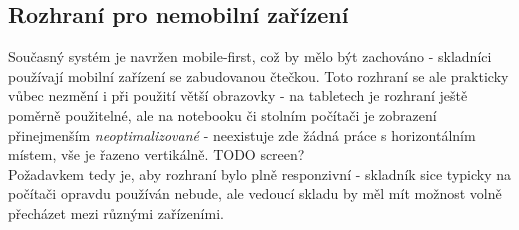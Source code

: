 \subsection{Rozhraní pro nemobilní zařízení}

Současný systém je navržen mobile-first, což by mělo být zachováno - skladníci používají mobilní zařízení se zabudovanou čtečkou. Toto rozhraní se ale prakticky vůbec nezmění i při použití větší obrazovky - na tabletech je rozhraní ještě poměrně použitelné, ale na notebooku či stolním počítači je zobrazení přinejmenším \emph{neoptimalizované} - neexistuje zde žádná práce s horizontálním místem, vše je řazeno vertikálně. TODO screen?\\
Požadavkem tedy je, aby rozhraní bylo plně responzivní - skladník sice typicky na počítači opravdu používán nebude, ale vedoucí skladu by měl mít možnost volně přecházet mezi různými zařízeními.
